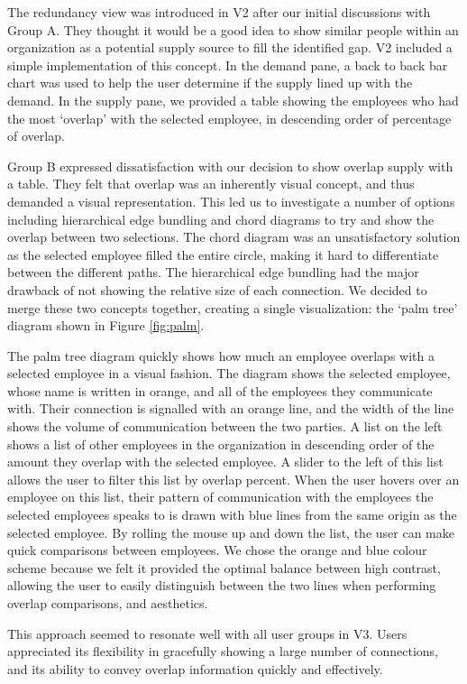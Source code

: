 \documentclass[journal]{vgtc}                %
\begin{document}
The redundancy view was introduced in V2 after our initial discussions with Group A.  They thought it would be a good idea to show similar people within an organization as a potential supply source to fill the identified gap. V2 included a simple implementation of this concept. In the demand pane, a back to back bar chart was used to help the user determine if the supply lined up with the demand. In the supply pane, we provided a table showing the employees who had the most \lq overlap\rq{} with the selected employee, in descending order of percentage of overlap.

Group B expressed dissatisfaction with our decision to show overlap supply with a table. They felt that overlap was an inherently visual concept, and thus demanded a visual representation. This led us to investigate a number of options including hierarchical edge bundling and chord diagrams to try and show the overlap between two selections.  The chord diagram was an unsatisfactory solution as the selected employee filled the entire circle, making it hard to differentiate between the different paths.  The hierarchical edge bundling had the major drawback of not showing the relative size of each connection.  We decided to merge these two concepts together, creating a single visualization: the \lq palm tree\rq{} diagram shown in Figure \ref{fig:palm}.

The palm tree diagram quickly shows how much an employee overlaps with a selected employee in a visual fashion. The diagram shows the selected employee, whose name is written in orange, and all of the employees they communicate with. Their connection is signalled with an orange line, and the width of the line shows the volume of communication between the two parties. A list on the left shows a list of other employees in the organization in descending order of the amount they overlap with the selected employee. A slider to the left of this list allows the user to filter this list by overlap percent. When the user hovers over an employee on this list, their pattern of communication with the employees the selected employees speaks to is drawn with blue lines from the same origin as the selected employee. By rolling the mouse up and down the list, the user can make quick comparisons between employees. We chose the orange and blue colour scheme because we felt it provided the optimal balance between high contrast, allowing the user to easily distinguish between the two lines when performing overlap comparisons, and aesthetics. 

This approach seemed to resonate well with all user groups in V3.  Users appreciated its flexibility in gracefully showing a large number of connections, and its ability to convey overlap information quickly and effectively. 
\end{document}

